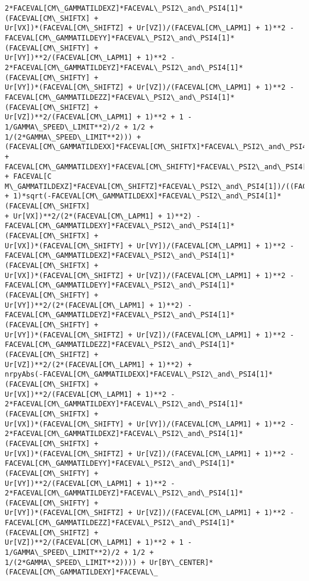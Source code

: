 \documentclass[landscape,letterpaper,10pt,english]{article}
\begin{document}
\begin{Verbatim}[commandchars=\\\{\}]
2*FACEVAL[CM\_GAMMATILDEXZ]*FACEVAL\_PSI2\_and\_PSI4[1]*(FACEVAL[CM\_SHIFTX] +
Ur[VX])*(FACEVAL[CM\_SHIFTZ] + Ur[VZ])/(FACEVAL[CM\_LAPM1] + 1)**2 -
FACEVAL[CM\_GAMMATILDEYY]*FACEVAL\_PSI2\_and\_PSI4[1]*(FACEVAL[CM\_SHIFTY] +
Ur[VY])**2/(FACEVAL[CM\_LAPM1] + 1)**2 -
2*FACEVAL[CM\_GAMMATILDEYZ]*FACEVAL\_PSI2\_and\_PSI4[1]*(FACEVAL[CM\_SHIFTY] +
Ur[VY])*(FACEVAL[CM\_SHIFTZ] + Ur[VZ])/(FACEVAL[CM\_LAPM1] + 1)**2 -
FACEVAL[CM\_GAMMATILDEZZ]*FACEVAL\_PSI2\_and\_PSI4[1]*(FACEVAL[CM\_SHIFTZ] +
Ur[VZ])**2/(FACEVAL[CM\_LAPM1] + 1)**2 + 1 - 1/GAMMA\_SPEED\_LIMIT**2)/2 + 1/2 +
1/(2*GAMMA\_SPEED\_LIMIT**2))) +
(FACEVAL[CM\_GAMMATILDEXX]*FACEVAL[CM\_SHIFTX]*FACEVAL\_PSI2\_and\_PSI4[1] +
FACEVAL[CM\_GAMMATILDEXY]*FACEVAL[CM\_SHIFTY]*FACEVAL\_PSI2\_and\_PSI4[1] + FACEVAL[C
M\_GAMMATILDEXZ]*FACEVAL[CM\_SHIFTZ]*FACEVAL\_PSI2\_and\_PSI4[1])/((FACEVAL[CM\_LAPM1]
+ 1)*sqrt(-FACEVAL[CM\_GAMMATILDEXX]*FACEVAL\_PSI2\_and\_PSI4[1]*(FACEVAL[CM\_SHIFTX]
+ Ur[VX])**2/(2*(FACEVAL[CM\_LAPM1] + 1)**2) -
FACEVAL[CM\_GAMMATILDEXY]*FACEVAL\_PSI2\_and\_PSI4[1]*(FACEVAL[CM\_SHIFTX] +
Ur[VX])*(FACEVAL[CM\_SHIFTY] + Ur[VY])/(FACEVAL[CM\_LAPM1] + 1)**2 -
FACEVAL[CM\_GAMMATILDEXZ]*FACEVAL\_PSI2\_and\_PSI4[1]*(FACEVAL[CM\_SHIFTX] +
Ur[VX])*(FACEVAL[CM\_SHIFTZ] + Ur[VZ])/(FACEVAL[CM\_LAPM1] + 1)**2 -
FACEVAL[CM\_GAMMATILDEYY]*FACEVAL\_PSI2\_and\_PSI4[1]*(FACEVAL[CM\_SHIFTY] +
Ur[VY])**2/(2*(FACEVAL[CM\_LAPM1] + 1)**2) -
FACEVAL[CM\_GAMMATILDEYZ]*FACEVAL\_PSI2\_and\_PSI4[1]*(FACEVAL[CM\_SHIFTY] +
Ur[VY])*(FACEVAL[CM\_SHIFTZ] + Ur[VZ])/(FACEVAL[CM\_LAPM1] + 1)**2 -
FACEVAL[CM\_GAMMATILDEZZ]*FACEVAL\_PSI2\_and\_PSI4[1]*(FACEVAL[CM\_SHIFTZ] +
Ur[VZ])**2/(2*(FACEVAL[CM\_LAPM1] + 1)**2) +
nrpyAbs(-FACEVAL[CM\_GAMMATILDEXX]*FACEVAL\_PSI2\_and\_PSI4[1]*(FACEVAL[CM\_SHIFTX] +
Ur[VX])**2/(FACEVAL[CM\_LAPM1] + 1)**2 -
2*FACEVAL[CM\_GAMMATILDEXY]*FACEVAL\_PSI2\_and\_PSI4[1]*(FACEVAL[CM\_SHIFTX] +
Ur[VX])*(FACEVAL[CM\_SHIFTY] + Ur[VY])/(FACEVAL[CM\_LAPM1] + 1)**2 -
2*FACEVAL[CM\_GAMMATILDEXZ]*FACEVAL\_PSI2\_and\_PSI4[1]*(FACEVAL[CM\_SHIFTX] +
Ur[VX])*(FACEVAL[CM\_SHIFTZ] + Ur[VZ])/(FACEVAL[CM\_LAPM1] + 1)**2 -
FACEVAL[CM\_GAMMATILDEYY]*FACEVAL\_PSI2\_and\_PSI4[1]*(FACEVAL[CM\_SHIFTY] +
Ur[VY])**2/(FACEVAL[CM\_LAPM1] + 1)**2 -
2*FACEVAL[CM\_GAMMATILDEYZ]*FACEVAL\_PSI2\_and\_PSI4[1]*(FACEVAL[CM\_SHIFTY] +
Ur[VY])*(FACEVAL[CM\_SHIFTZ] + Ur[VZ])/(FACEVAL[CM\_LAPM1] + 1)**2 -
FACEVAL[CM\_GAMMATILDEZZ]*FACEVAL\_PSI2\_and\_PSI4[1]*(FACEVAL[CM\_SHIFTZ] +
Ur[VZ])**2/(FACEVAL[CM\_LAPM1] + 1)**2 + 1 - 1/GAMMA\_SPEED\_LIMIT**2)/2 + 1/2 +
1/(2*GAMMA\_SPEED\_LIMIT**2)))) + Ur[BY\_CENTER]*(FACEVAL[CM\_GAMMATILDEXY]*FACEVAL\_

\end{Verbatim}
\end{document}
